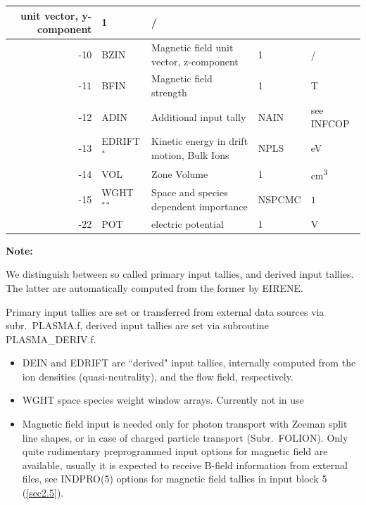 \begin{landscape}
\begin{longtable}{|r|l|l|l|l|}
    unit vector, y-component         & 1                                      & /
    \\ \hline
    -10                              & BZIN                                   & Magnetic field
    unit vector, z-component         & 1                                      & /
    \\ \hline
    -11                              & BFIN                                   & Magnetic field
    strength                         & 1                                      & \si{\tesla}
    \\ \hline
    -12                              & ADIN                                   & Additional input
    tally                            & NAIN                                   & see INFCOP
    \\ \hline
    -13                              & EDRIFT$^*$                             & Kinetic energy in
    drift motion, Bulk Ions          & NPLS                                   & \si{\electronvolt}
    \\ \hline
    -14                              & VOL                                    & Zone Volume
				     & 1                                      & \si{\cubic\centi\metre}
    \\ \hline
    -15                              & WGHT$^{**}
    $                                & Space and species dependent importance & NSPCMC                       & $ 1 $
			      \\
    \hline
    -22                              & POT                                    & electric potential
				     & 1                                      & \si{\volt}                           \\ \hline
  \end{longtable}

  \textbf{Note:}

  We distinguish between so called primary input tallies, and
  derived input tallies.
  The latter are automatically computed from the former by EIRENE.

  Primary input tallies are set or transferred from external data sources via
  subr.\ PLASMA.f, derived input tallies are set via subroutine PLASMA\_DERIV.f.
  \begin{itemize}
    \item DEIN and EDRIFT are ``derived" input tallies, internally computed from
          the ion densities (quasi-neutrality), and the flow field, respectively.
    \item WGHT space species  weight window arrays.
          Currently not in use
    \item Magnetic field input is needed only for photon transport with Zeeman
          split line shapes, or in case of charged particle transport (Subr.\ FOLION).
          Only quite rudimentary preprogrammed input options for magnetic field are
          available, usually it is expected to receive B-field information from external
          files, see INDPRO(5) options for magnetic field tallies in input block 5
          (\cref{sec2.5}).
  \end{itemize}


\end{landscape}
